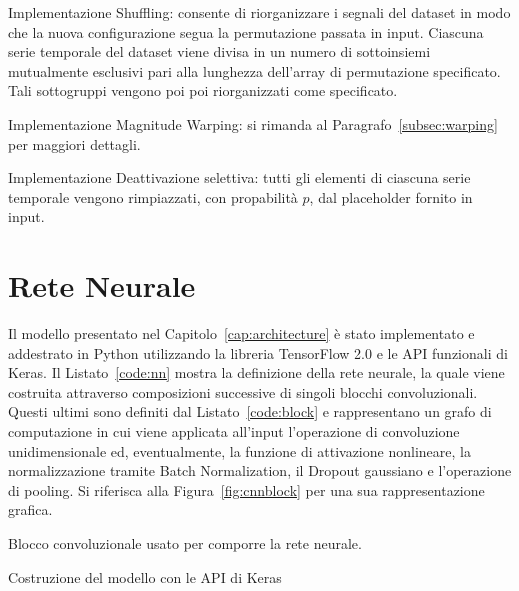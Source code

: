 \begin{listing}[p]
  \caption{Implementazione Shuffling: consente di riorganizzare i segnali del
    dataset in modo che la nuova configurazione segua la permutazione passata
    in input. Ciascuna serie temporale del dataset viene divisa in un numero di
    sottoinsiemi mutualmente esclusivi pari alla lunghezza dell'array di
    permutazione specificato. Tali sottogruppi vengono poi poi riorganizzati
    come specificato.}
\end{listing}


\begin{listing}[p]
	\caption{Implementazione Magnitude Warping: si rimanda al
    Paragrafo~\ref{subsec:warping} per maggiori dettagli.}
\end{listing}

\begin{listing}[p]
  \caption{Implementazione Deattivazione selettiva: tutti gli elementi di
    ciascuna serie temporale vengono rimpiazzati, con propabilità \(p\), dal
    placeholder fornito in input.}
\end{listing}

\section{Rete Neurale}
Il modello presentato nel Capitolo~\ref{cap:architecture} è stato implementato
e addestrato in Python utilizzando la libreria TensorFlow 2.0 e le API
funzionali di Keras. Il Listato~\ref{code:nn} mostra la definizione della rete
neurale, la quale viene costruita attraverso composizioni successive di singoli
blocchi convoluzionali. 
Questi ultimi sono definiti dal
Listato~\ref{code:block} e rappresentano un grafo di computazione in cui viene
applicata all'input l'operazione di convoluzione unidimensionale ed,
eventualmente, la funzione di attivazione nonlineare, la normalizzazione
tramite Batch Normalization, il Dropout gaussiano e l'operazione di pooling. Si
riferisca alla Figura~\ref{fig:cnnblock} per una sua rappresentazione grafica.
\begin{listing}[htp]
	\caption{Blocco convoluzionale usato per comporre la rete neurale.}
  \label{code:block}
\end{listing}
\begin{listing}[htp]
  \caption{Costruzione del modello con le API di Keras}
  \label{code:nn}
\end{listing}




